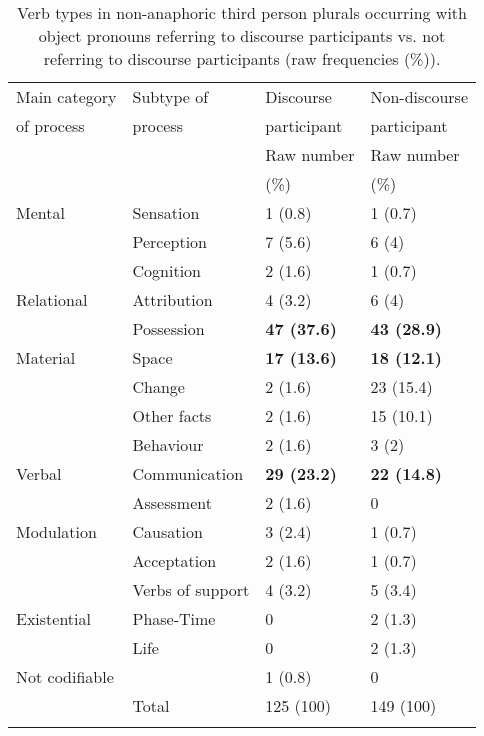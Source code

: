 \documentclass[output=paper]{langscibook}
\begin{document}
\begin{table}
\begin{tabular}{llll}

\lsptoprule

 {Main} {category} &  {Subtype} {of} &  {Discourse} & {Non-discourse}\\
{of} {process} &  {process} & {participant} & {participant}\\
& & {Raw} {number} & {Raw} {number}\\
& & {(\%)} & {(\%)}\\
 \midrule
 {Mental} &  Sensation  &  1 (0.8) &  1 (0.7)\\
&  Perception  &  7 (5.6) &  6 (4)\\
&  Cognition  &  2 (1.6) &  1 (0.7)\\
\midrule
 {Relational} &  Attribution  &  4 (3.2) &  6 (4)\\
&  Possession  &  \textbf{{47} {(37.6)}} &  \textbf{{43} {(28.9)}}\\
 \midrule
{Material}  &  Space  &  \textbf{{17} {(13.6)}} &  \textbf{{18} {(12.1)}}\\
&  Change  &  2 (1.6) &  {23} {(15.4)}\\
&  Other facts  &  2 (1.6) &  {15} {(10.1)}\\
&  Behaviour  &  2 (1.6) &  3 (2)\\
\midrule
 {Verbal}  &  Communication  &  \textbf{{29} {(23.2)}} &  \textbf{{22} {(14.8)}}\\
 \midrule
&  Assessment  &  2 (1.6) &  0\\
 \midrule
 {Modulation}  &  Causation  &  3 (2.4) &  1 (0.7)\\
&  Acceptation  &  2 (1.6) &  1 (0.7)\\
&  Verbs of support &  4 (3.2) &  5 (3.4)\\
\midrule
 {Existential} &  Phase-Time  &  0 &  2 (1.3)\\
&  Life  &  0 &  2 (1.3)\\
\midrule
 {Not} {codifiable}  &  &  1 (0.8) &  0\\
 \midrule
& Total  &  125 (100) &  149 (100)\\
\lspbottomrule
\end{tabular}
\caption{Verb types in non-anaphoric third person plurals occurring with object pronouns referring to discourse participants vs. not referring to discourse participants (raw frequencies (\%)).}
\label{tab:pierre:4}
\end{table}
\end{document}
